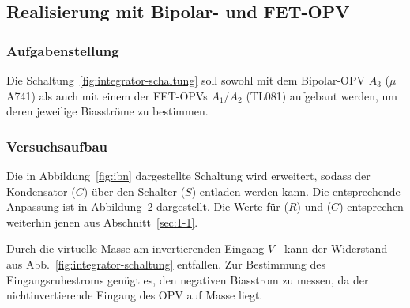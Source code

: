 \subsection{Realisierung mit Bipolar- und FET-OPV}\label{sec:1-2}
\subsubsection{Aufgabenstellung}
Die Schaltung~\ref{fig:integrator-schaltung} soll sowohl mit dem Bipolar-OPV $A_3$ ($\mu$A741) als auch mit einem der FET-OPVs $A_1$/$A_2$ (TL081) aufgebaut werden, um deren jeweilige Biasströme zu bestimmen.

\subsubsection{Versuchsaufbau}
Die in Abbildung~\ref{fig:ibn} dargestellte Schaltung wird erweitert, sodass der Kondensator ($C$) über den Schalter ($S$) entladen werden kann. Die entsprechende Anpassung ist in Abbildung~2 dargestellt. Die Werte für ($R$) und ($C$) entsprechen weiterhin jenen aus Abschnitt~\ref{sec:1-1}.

Durch die virtuelle Masse am invertierenden Eingang $V_-$ kann der Widerstand aus Abb.~\ref{fig:integrator-schaltung} entfallen. Zur Bestimmung des Eingangsruhestroms genügt es, den negativen Biasstrom zu messen, da der nichtinvertierende Eingang des OPV auf Masse liegt.

